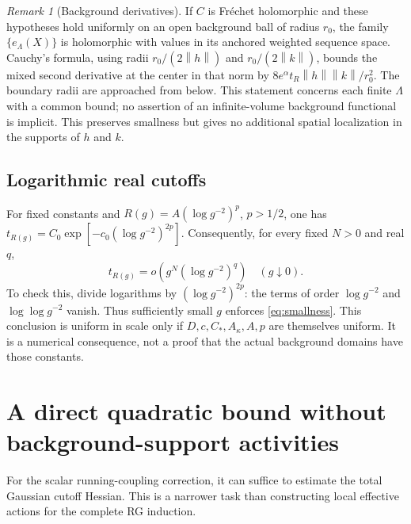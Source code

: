 \documentclass[11pt]{article}
\theoremstyle{remark}
\newtheorem{remark}[theorem]{Remark}
\newcommand{\norm}[1]{\left\|#1\right\|}
\begin{document}
\begin{remark}[Background derivatives]
If $C$ is Fr\'echet holomorphic and these hypotheses hold uniformly
on an open background ball of radius $r_0$, the
family $\{e_\Lambda(X)\}$ is holomorphic with values in its anchored
weighted sequence space. Cauchy's formula, using radii
$r_0/(2\norm h)$ and $r_0/(2\norm k)$, bounds the mixed second
derivative at the center in that norm by
$8e^\alpha t_R\norm h\norm k/r_0^2$.
The boundary radii are approached from below. This statement concerns
each finite $\Lambda$ with a common bound; no assertion of an
infinite-volume background functional is implicit.
This preserves smallness but gives no additional spatial localization
in the supports of $h$ and $k$.
\end{remark}

\subsection{Logarithmic real cutoffs}

For fixed constants and $R(g)=A(\log g^{-2})^p$, $p>1/2$, one has
$t_{R(g)}=C_0\exp[-c_0(\log g^{-2})^{2p}]$. Consequently, for
every fixed $N>0$ and real $q$,
\[
 t_{R(g)}=o\!\left(g^N(\log g^{-2})^q\right)
 \quad(g\downarrow0).
\]
To check this, divide logarithms by $(\log g^{-2})^{2p}$: the terms
of order $\log g^{-2}$ and $\log\log g^{-2}$ vanish. Thus sufficiently
small $g$ enforces \eqref{eq:smallness}. This conclusion is uniform
in scale only if $D,c,C_*,A_\kappa,A,p$ are themselves uniform.
It is a numerical consequence, not a proof that the actual background
domains have those constants.

\section{A direct quadratic bound without background-support activities}

For the scalar running-coupling correction, it can suffice to estimate
the total Gaussian cutoff Hessian. This is a narrower task than
constructing local effective actions for the complete RG induction.
\end{document}
